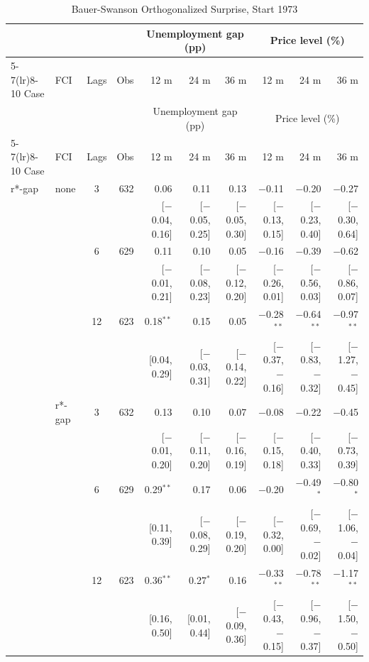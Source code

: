 \begingroup\scriptsize\setlength{\tabcolsep}{0.9pt}
\begin{longtable}{llcrrrrrrr}
\caption{Bauer-Swanson Orthogonalized Surprise, Start 1973}\label{tab:appR5a73}\\
\toprule
 & & & & \multicolumn{3}{c}{Unemployment gap (pp)} & \multicolumn{3}{c}{Price level (\%)}\\ \cmidrule(lr){5-7}\cmidrule(lr){8-10}
Case & FCI & Lags & Obs & 12 m & 24 m & 36 m & 12 m & 24 m & 36 m\\
\midrule\endfirsthead
\toprule
 & & & & \multicolumn{3}{c}{Unemployment gap (pp)} & \multicolumn{3}{c}{Price level (\%)}\\ \cmidrule(lr){5-7}\cmidrule(lr){8-10}
Case & FCI & Lags & Obs & 12 m & 24 m & 36 m & 12 m & 24 m & 36 m\\
\midrule\endhead
\bottomrule\endfoot
r*-gap & none & 3 & 632 & 0.06 & 0.11 & 0.13 & $-$0.11 & $-$0.20 & $-$0.27\\
 & & & & {\scriptsize [$-$0.04, 0.16]} & {\scriptsize [$-$0.05, 0.25]} & {\scriptsize [$-$0.05, 0.30]} & {\scriptsize [$-$0.13, 0.15]} & {\scriptsize [$-$0.23, 0.40]} & {\scriptsize [$-$0.30, 0.64]}\\
 &  & 6 & 629 & 0.11 & 0.10 & 0.05 & $-$0.16 & $-$0.39 & $-$0.62\\
 & & & & {\scriptsize [$-$0.01, 0.21]} & {\scriptsize [$-$0.08, 0.23]} & {\scriptsize [$-$0.12, 0.20]} & {\scriptsize [$-$0.26, 0.01]} & {\scriptsize [$-$0.56, 0.03]} & {\scriptsize [$-$0.86, 0.07]}\\
 &  & 12 & 623 & 0.18$^{**}$ & 0.15 & 0.05 & $-$0.28$^{**}$ & $-$0.64$^{**}$ & $-$0.97$^{**}$\\
 & & & & {\scriptsize [0.04, 0.29]} & {\scriptsize [$-$0.03, 0.31]} & {\scriptsize [$-$0.14, 0.22]} & {\scriptsize [$-$0.37, $-$0.16]} & {\scriptsize [$-$0.83, $-$0.32]} & {\scriptsize [$-$1.27, $-$0.45]}\\
 & r*-gap & 3 & 632 & 0.13 & 0.10 & 0.07 & $-$0.08 & $-$0.22 & $-$0.45\\
 & & & & {\scriptsize [$-$0.01, 0.20]} & {\scriptsize [$-$0.11, 0.20]} & {\scriptsize [$-$0.16, 0.19]} & {\scriptsize [$-$0.15, 0.18]} & {\scriptsize [$-$0.40, 0.33]} & {\scriptsize [$-$0.73, 0.39]}\\
 &  & 6 & 629 & 0.29$^{**}$ & 0.17 & 0.06 & $-$0.20 & $-$0.49$^{*}$ & $-$0.80$^{*}$\\
 & & & & {\scriptsize [0.11, 0.39]} & {\scriptsize [$-$0.08, 0.29]} & {\scriptsize [$-$0.19, 0.20]} & {\scriptsize [$-$0.32, 0.00]} & {\scriptsize [$-$0.69, $-$0.02]} & {\scriptsize [$-$1.06, $-$0.04]}\\
 &  & 12 & 623 & 0.36$^{**}$ & 0.27$^{*}$ & 0.16 & $-$0.33$^{**}$ & $-$0.78$^{**}$ & $-$1.17$^{**}$\\
 & & & & {\scriptsize [0.16, 0.50]} & {\scriptsize [0.01, 0.44]} & {\scriptsize [$-$0.09, 0.36]} & {\scriptsize [$-$0.43, $-$0.15]} & {\scriptsize [$-$0.96, $-$0.37]} & {\scriptsize [$-$1.50, $-$0.50]}\\
\end{longtable}
